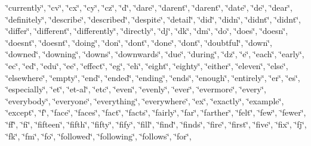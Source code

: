 \char`\"{}currently\char`\"{}, \char`\"{}cv\char`\"{}, \char`\"{}cx\char`\"{}, \char`\"{}cy\char`\"{}, \char`\"{}cz\char`\"{}, \char`\"{}d\char`\"{}, \char`\"{}dare\char`\"{}, \char`\"{}daren\textquotesingle{}t\char`\"{}, \char`\"{}darent\char`\"{}, \char`\"{}date\char`\"{}, \char`\"{}de\char`\"{}, \char`\"{}dear\char`\"{}, \char`\"{}definitely\char`\"{}, \char`\"{}describe\char`\"{}, \char`\"{}described\char`\"{}, \char`\"{}despite\char`\"{}, \char`\"{}detail\char`\"{}, \char`\"{}did\char`\"{}, \char`\"{}didn\char`\"{}, \char`\"{}didn\textquotesingle{}t\char`\"{}, \char`\"{}didnt\char`\"{}, \char`\"{}differ\char`\"{}, \char`\"{}different\char`\"{}, \char`\"{}differently\char`\"{}, \char`\"{}directly\char`\"{}, \char`\"{}dj\char`\"{}, \char`\"{}dk\char`\"{}, \char`\"{}dm\char`\"{}, \char`\"{}do\char`\"{}, \char`\"{}does\char`\"{}, \char`\"{}doesn\char`\"{}, \char`\"{}doesn\textquotesingle{}t\char`\"{}, \char`\"{}doesnt\char`\"{}, \char`\"{}doing\char`\"{}, \char`\"{}don\char`\"{}, \char`\"{}don\textquotesingle{}t\char`\"{}, \char`\"{}done\char`\"{}, \char`\"{}dont\char`\"{}, \char`\"{}doubtful\char`\"{}, \char`\"{}down\char`\"{}, \char`\"{}downed\char`\"{}, \char`\"{}downing\char`\"{}, \char`\"{}downs\char`\"{}, \char`\"{}downwards\char`\"{}, \char`\"{}due\char`\"{}, \char`\"{}during\char`\"{}, \char`\"{}dz\char`\"{}, \char`\"{}e\char`\"{}, \char`\"{}each\char`\"{}, \char`\"{}early\char`\"{}, \char`\"{}ec\char`\"{}, \char`\"{}ed\char`\"{}, \char`\"{}edu\char`\"{}, \char`\"{}ee\char`\"{}, \char`\"{}effect\char`\"{}, \char`\"{}eg\char`\"{}, \char`\"{}eh\char`\"{}, \char`\"{}eight\char`\"{}, \char`\"{}eighty\char`\"{}, \char`\"{}either\char`\"{}, \char`\"{}eleven\char`\"{}, \char`\"{}else\char`\"{}, \char`\"{}elsewhere\char`\"{}, \char`\"{}empty\char`\"{}, \char`\"{}end\char`\"{}, \char`\"{}ended\char`\"{}, \char`\"{}ending\char`\"{}, \char`\"{}ends\char`\"{}, \char`\"{}enough\char`\"{}, \char`\"{}entirely\char`\"{}, \char`\"{}er\char`\"{}, \char`\"{}es\char`\"{}, \char`\"{}especially\char`\"{}, \char`\"{}et\char`\"{}, \char`\"{}et-\/al\char`\"{}, \char`\"{}etc\char`\"{}, \char`\"{}even\char`\"{}, \char`\"{}evenly\char`\"{}, \char`\"{}ever\char`\"{}, \char`\"{}evermore\char`\"{}, \char`\"{}every\char`\"{}, \char`\"{}everybody\char`\"{}, \char`\"{}everyone\char`\"{}, \char`\"{}everything\char`\"{}, \char`\"{}everywhere\char`\"{}, \char`\"{}ex\char`\"{}, \char`\"{}exactly\char`\"{}, \char`\"{}example\char`\"{}, \char`\"{}except\char`\"{}, \char`\"{}f\char`\"{}, \char`\"{}face\char`\"{}, \char`\"{}faces\char`\"{}, \char`\"{}fact\char`\"{}, \char`\"{}facts\char`\"{}, \char`\"{}fairly\char`\"{}, \char`\"{}far\char`\"{}, \char`\"{}farther\char`\"{}, \char`\"{}felt\char`\"{}, \char`\"{}few\char`\"{}, \char`\"{}fewer\char`\"{}, \char`\"{}ff\char`\"{}, \char`\"{}fi\char`\"{}, \char`\"{}fifteen\char`\"{}, \char`\"{}fifth\char`\"{}, \char`\"{}fifty\char`\"{}, \char`\"{}fify\char`\"{}, \char`\"{}fill\char`\"{}, \char`\"{}find\char`\"{}, \char`\"{}finds\char`\"{}, \char`\"{}fire\char`\"{}, \char`\"{}first\char`\"{}, \char`\"{}five\char`\"{}, \char`\"{}fix\char`\"{}, \char`\"{}fj\char`\"{}, \char`\"{}fk\char`\"{}, \char`\"{}fm\char`\"{}, \char`\"{}fo\char`\"{}, \char`\"{}followed\char`\"{}, \char`\"{}following\char`\"{}, \char`\"{}follows\char`\"{}, \char`\"{}for\char`\"{}, 